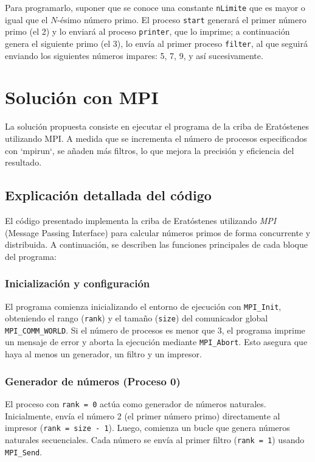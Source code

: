 \documentclass[a4paper,12pt]{article}
\begin{document}
Para programarlo, suponer que se conoce una constante \texttt{nLimite} que es mayor o igual que el \(N\)-ésimo número primo. El proceso \texttt{start} generará el primer número primo (el 2) y lo enviará al proceso \texttt{printer}, que lo imprime; a continuación genera el siguiente primo (el 3), lo envía al primer proceso \texttt{filter}, al que seguirá enviando los siguientes números impares: 5, 7, 9, y así sucesivamente. 


\section{Solución con MPI}

La solución propuesta consiste en ejecutar el programa de la criba de Eratóstenes utilizando MPI. A medida que se incrementa el número de procesos especificados con `mpirun`, se añaden más filtros, lo que mejora la precisión y eficiencia del resultado.



\subsection{Explicación detallada del código}

El código presentado implementa la criba de Eratóstenes utilizando \textit{MPI} (Message Passing Interface) para calcular números primos de forma concurrente y distribuida. A continuación, se describen las funciones principales de cada bloque del programa:

\subsubsection{Inicialización y configuración}
El programa comienza inicializando el entorno de ejecución con \texttt{MPI\_Init}, obteniendo el rango (\texttt{rank}) y el tamaño (\texttt{size}) del comunicador global \texttt{MPI\_COMM\_WORLD}. Si el número de procesos es menor que 3, el programa imprime un mensaje de error y aborta la ejecución mediante \texttt{MPI\_Abort}. Esto asegura que haya al menos un generador, un filtro y un impresor.

\subsubsection{Generador de números (Proceso 0)}
El proceso con \texttt{rank = 0} actúa como generador de números naturales. Inicialmente, envía el número 2 (el primer número primo) directamente al impresor (\texttt{rank = size - 1}). Luego, comienza un bucle que genera números naturales secuenciales. Cada número se envía al primer filtro (\texttt{rank = 1}) usando \texttt{MPI\_Send}.
\end{document}
